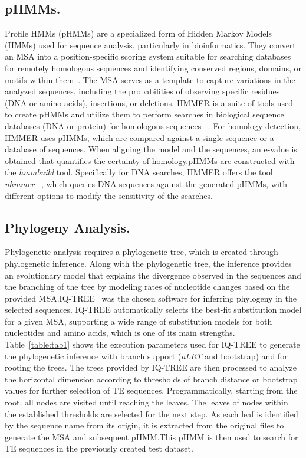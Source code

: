 \documentclass[unnumsec,webpdf,contemporary,large]{oup-authoring-template}%
\theoremstyle{thmstyleone}%
\theoremstyle{thmstyletwo}%
\theoremstyle{thmstylethree}%
\begin{document}
\subsection{pHMMs.}\label{subsec2_2}

Profile HMMs (pHMMs) are a specialized form of Hidden Markov Models (HMMs) used
for sequence analysis, particularly in bioinformatics. They convert an MSA into
a position-specific scoring system suitable for searching databases for remotely
homologous sequences and identifying conserved regions, domains, or motifs
within them~\cite{eddy_profile_1998}. The MSA serves as a template to capture
variations in the analyzed sequences, including the probabilities of observing
specific residues (DNA or amino acids), insertions, or deletions. HMMER is a
suite of tools used to create pHMMs and utilize them to perform searches in
biological sequence databases (DNA or protein) for homologous sequences
~\cite{eddy_profile_1998}. For homology detection, HMMER uses pHMMs, which are
compared against a single sequence or a database of sequences. When aligning the
model and the sequences, an e-value is obtained that quantifies the certainty of
homology.\@ pHMMs are constructed with the \textit{hmmbuild} tool. Specifically
for DNA searches, HMMER offers the tool \textit{nhmmer}
~\cite{wheeler_nhmmer_2013}, which queries DNA sequences against the generated
pHMMs, with different options to modify the sensitivity of the searches.

\subsection{Phylogeny Analysis.}\label{subsec2_3}

Phylogenetic analysis requires a phylogenetic tree, which is created through
phylogenetic inference. Along with the phylogenetic tree, the inference provides
an evolutionary model that explains the divergence observed in the sequences and
the branching of the tree by modeling rates of nucleotide changes based on the
provided MSA.\@ IQ-TREE~\cite{bui_quang_minh_iq-tree_2022} was the chosen
software for inferring phylogeny in the selected sequences. IQ-TREE
automatically selects the best-fit substitution model for a given MSA,
supporting a wide range of substitution models for both nucleotides and amino
acids, which is one of its main strengths. Table~\ref{table:tab1} shows the
execution parameters used for IQ-TREE to generate the phylogenetic inference
with branch support (\textit{aLRT} and bootstrap) and for rooting the trees. The
trees provided by IQ-TREE are then processed to analyze the horizontal dimension
according to thresholds of branch distance or bootstrap values for further
selection of TE sequences. Programmatically, starting from the root, all nodes
are visited until reaching the leaves. The leaves of nodes within the
established thresholds are selected for the next step. As each leaf is
identified by the sequence name from its origin, it is extracted from the
original files to generate the MSA and subsequent pHMM.\@ This pHMM is then used
to search for TE sequences in the previously created test dataset.
\end{document}
